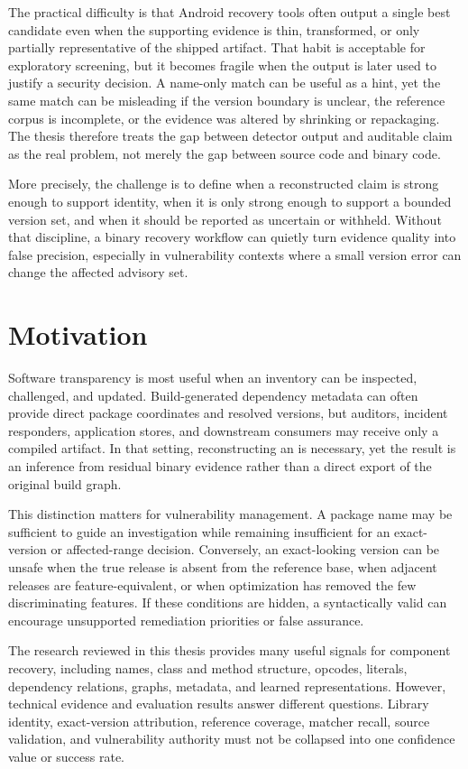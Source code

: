 The practical difficulty is that Android recovery tools often output a
single best candidate even when the supporting evidence is thin,
transformed, or only partially representative of the shipped artifact. That
habit is acceptable for exploratory screening, but it becomes fragile when
the output is later used to justify a security decision. A name-only match
can be useful as a hint, yet the same match can be misleading if the version
boundary is unclear, the reference corpus is incomplete, or the evidence was
altered by shrinking or repackaging. The thesis therefore treats the gap
between detector output and auditable claim as the real problem, not merely
the gap between source code and binary code.

More precisely, the challenge is to define when a reconstructed claim is
strong enough to support identity, when it is only strong enough to support a
bounded version set, and when it should be reported as uncertain or
withheld. Without that discipline, a binary recovery workflow can quietly
turn evidence quality into false precision, especially in vulnerability
contexts where a small version error can change the affected advisory set.

\section{Motivation}

Software transparency is most useful when an inventory can be inspected,
challenged, and updated. Build-generated dependency metadata can often provide
direct package coordinates and resolved versions, but auditors, incident
responders, application stores, and downstream consumers may receive only a
compiled artifact. In that setting, reconstructing an \SBOM is necessary, yet
the result is an inference from residual binary evidence rather than a direct
export of the original build graph.

This distinction matters for vulnerability management. A package name may be
sufficient to guide an investigation while remaining insufficient for an
exact-version or affected-range decision. Conversely, an exact-looking version
can be unsafe when the true release is absent from the reference base, when
adjacent releases are feature-equivalent, or when optimization has removed the
few discriminating features. If these conditions are hidden, a syntactically
valid \SBOM can encourage unsupported remediation priorities or false
assurance.

The research reviewed in this thesis provides many useful signals for
component recovery, including names, class and method structure, opcodes,
literals, dependency relations, graphs, metadata, and learned
representations. However, technical evidence and evaluation results answer
different questions. Library identity, exact-version attribution, reference
coverage, matcher recall, source validation, and vulnerability authority must
not be collapsed into one confidence value or success rate.

